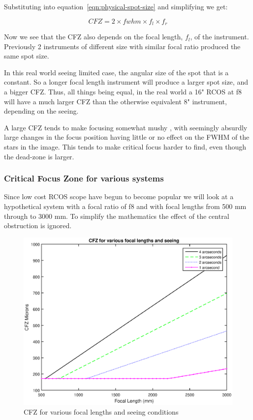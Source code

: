 \documentclass[11pt]{article}
\begin{document}
Substituting into equation~\ref{eqn:physical-spot-size} and simplifying we get:

\begin{equation}
CFZ=2\times fwhm \times f_{l} \times f_{r}
\end{equation}

Now we see that the CFZ also depends on the focal length, $f_{l}$, of the instrument.  Previously 2 instruments of different size with similar focal ratio produced the same spot size.  

In this real world seeing limited case, the angular size of the spot that is a constant.  So a longer focal length instrument will produce a larger spot size, and a bigger CFZ.  Thus, all things being equal, in the real world a 16" RCOS at f8 will have a much larger CFZ than the otherwise equivalent 8" instrument, depending on the seeing.

A large CFZ tends to make focusing somewhat mushy , with seemingly absurdly large changes in the focus position having little or no effect on the FWHM of the stars in the image.  This tends to make critical focus harder to find, even though the dead-zone is larger.  

\subsubsection{Critical Focus Zone for various systems}

Since low cost RCOS scope have begun to become popular we will look at a hypothetical system with a focal ratio of f8 and with focal lengths from 500 mm through to 3000 mm. To simplify the mathematics the effect of the central obstruction is ignored.


\begin{figure}[htb]
	\begin{center}
		\includegraphics[scale=0.9]{./images/cfz-seeing.eps}
		\caption{CFZ for various focal lengths and seeing conditions}
		\label{fig:cfz-seeing}
	\end{center}
\end{figure}
\end{document}
